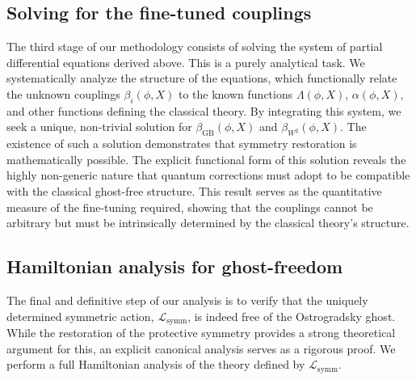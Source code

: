 \documentclass[twocolumn]{aastex631}
\begin{document}
\subsection{Solving for the fine-tuned couplings}

The third stage of our methodology consists of solving the system of partial differential equations derived above. This is a purely analytical task. We systematically analyze the structure of the equations, which functionally relate the unknown couplings $\beta_i(\phi,X)$ to the known functions $\Lambda(\phi,X)$, $\alpha(\phi,X)$, and other functions defining the classical theory. By integrating this system, we seek a unique, non-trivial solution for $\beta_{\text{GB}}(\phi, X)$ and $\beta_{W^2}(\phi, X)$. The existence of such a solution demonstrates that symmetry restoration is mathematically possible. The explicit functional form of this solution reveals the highly non-generic nature that quantum corrections must adopt to be compatible with the classical ghost-free structure. This result serves as the quantitative measure of the fine-tuning required, showing that the couplings cannot be arbitrary but must be intrinsically determined by the classical theory's structure.

\subsection{Hamiltonian analysis for ghost-freedom}

The final and definitive step of our analysis is to verify that the uniquely determined symmetric action, $\mathcal{L}_{\text{symm}}$, is indeed free of the Ostrogradsky ghost. While the restoration of the protective symmetry provides a strong theoretical argument for this, an explicit canonical analysis serves as a rigorous proof. We perform a full Hamiltonian analysis of the theory defined by $\mathcal{L}_{\text{symm}}$.
\end{document}
